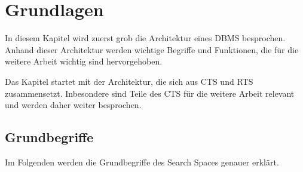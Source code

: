 \newpage
\section{Grundlagen}

In diesem Kapitel wird zuerst grob die Architektur eines \ac{DBMS} besprochen. Anhand dieser Architektur werden wichtige Begriffe und Funktionen, die für die weitere Arbeit wichtig sind hervorgehoben.

Das Kapitel startet mit der Architektur, die sich aus \ac{CTS} und \ac{RTS} zusammensetzt. Inbesondere sind Teile des \ac{CTS} für die weitere Arbeit relevant und werden daher weiter besprochen. 






\subsection{Grundbegriffe}
Im Folgenden werden die Grundbegriffe des Search Spaces genauer erklärt. 










